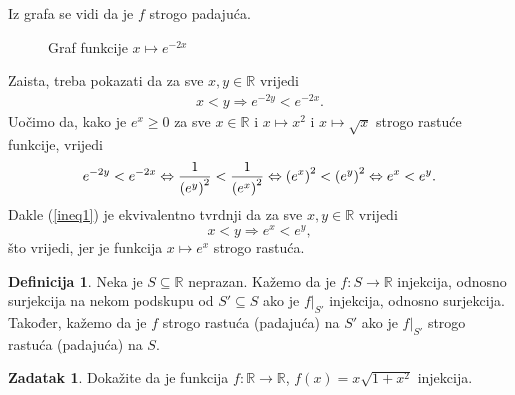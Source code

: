 \documentclass{book}
\let\originalleft\left
\let\originalright\right
\renewcommand{\left}{\mathopen{}\mathclose\bgroup\originalleft}
\renewcommand{\right}{\aftergroup\egroup\originalright}
\renewenvironment{proof}{%
    \vspace{-\parskip}\begin{oldproof}%
    }{%
    \end{oldproof}%
}
\theoremstyle{definition}
\theoremstyle{definition}
\newtheorem{definition}{Definicija}
\newtheorem{exercise}{Zadatak}
\theoremstyle{remark}
\begin{document}
\begin{proof}[Rješenje]
Iz grafa se vidi da je $f$ strogo padajuća. 
\begin{figure}[ht]
\begin{center}
\end{center}
\caption{\label{grexp} Graf funkcije $x\mapsto e^{-2x}$}
\end{figure}

Zaista, treba pokazati da za sve $x, y\in \mathbb{R}$ vrijedi
\begin{gather}
\label{ineq1}
x<y\Rightarrow e^{-2y}<e^{-2x}.
\end{gather}
Uočimo da, kako je $e^x\geq 0$ za sve $x\in \mathbb{R}$ i $x\mapsto x^2$ i $x\mapsto \sqrt{x}$ strogo rastuće funkcije, vrijedi
$$e^{-2y}<e^{-2x}\Leftrightarrow \dfrac{1}{\left(e^{y}\right)^2}<\dfrac{1}{\left(e^{x}\right)^2}\Leftrightarrow \left(e^{x}\right)^2<\left(e^{y}\right)^2\Leftrightarrow e^x<e^y.$$
Dakle (\ref{ineq1}) je ekvivalentno tvrdnji da za sve $x,y\in \mathbb{R}$ vrijedi $$x<y\Rightarrow e^x<e^y,$$
što vrijedi, jer je funkcija $x\mapsto e^x$ strogo rastuća.
\end{proof}
\begin{definition}
Neka je $S\subseteq \mathbb{R}$ neprazan. Kažemo da je $f : S\to \mathbb{R}$ injekcija, odnosno surjekcija na nekom podskupu od $S'\subseteq S$ ako je $f|_{S'}$ injekcija, odnosno surjekcija. Također, kažemo da je $f$ strogo rastuća (padajuća) na $S'$ ako je $f|_{S'}$ strogo rastuća (padajuća) na $S$.
\end{definition}
\begin{exercise}
Dokažite da je funkcija $f : \mathbb{R}\to \mathbb{R}$, $f(x)=x\sqrt{1+x^2}$ injekcija.
\end{exercise}
\end{document}
